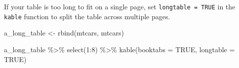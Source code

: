 \documentclass[a4paper, nobind]{templates/ociamthesis}
\newenvironment{Shaded}{\begin{snugshade}}{\end{snugshade}}
\newcommand{\AttributeTok}[1]{\textcolor[rgb]{0.77,0.63,0.00}{#1}}
\newcommand{\ConstantTok}[1]{\textcolor[rgb]{0.00,0.00,0.00}{#1}}
\newcommand{\DecValTok}[1]{\textcolor[rgb]{0.00,0.00,0.81}{#1}}
\newcommand{\FunctionTok}[1]{\textcolor[rgb]{0.00,0.00,0.00}{#1}}
\newcommand{\NormalTok}[1]{#1}
\newcommand{\OtherTok}[1]{\textcolor[rgb]{0.56,0.35,0.01}{#1}}
\newcommand{\SpecialCharTok}[1]{\textcolor[rgb]{0.00,0.00,0.00}{#1}}
\renewenvironment{Shaded}
{
  \vspace{10pt}%
  \begin{snugshade}%
}{%
  \end{snugshade}%
  \vspace{8pt}%
}
\begin{document}
If your table is too long to fit on a single page, set \texttt{longtable\ =\ TRUE} in the \texttt{kable} function to split the table across multiple pages.

\begin{Shaded}
\begin{Highlighting}[]
\NormalTok{a\_long\_table }\OtherTok{\textless{}{-}} \FunctionTok{rbind}\NormalTok{(mtcars, mtcars)}

\NormalTok{a\_long\_table }\SpecialCharTok{\%\textgreater{}\%} 
  \FunctionTok{select}\NormalTok{(}\DecValTok{1}\SpecialCharTok{:}\DecValTok{8}\NormalTok{) }\SpecialCharTok{\%\textgreater{}\%} 
  \FunctionTok{kable}\NormalTok{(}\AttributeTok{booktabs =} \ConstantTok{TRUE}\NormalTok{, }\AttributeTok{longtable =} \ConstantTok{TRUE}\NormalTok{)}
\end{Highlighting}
\end{Shaded}
\end{document}
